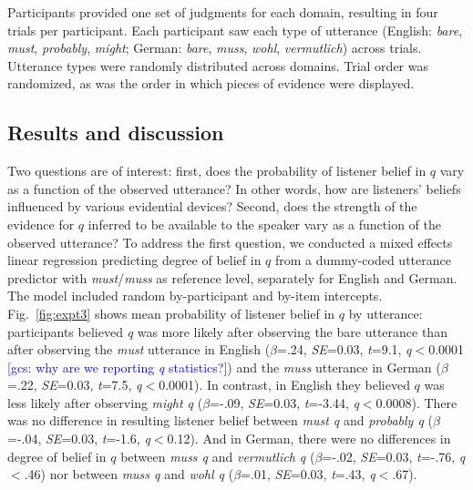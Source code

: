 \documentclass[11pt]{article}
\newcommand{\gcs}[1]{\textcolor{blue}{[gcs: #1]}}
\begin{document}
Participants provided one set of judgments for each domain, resulting in four trials per participant. Each participant saw each type of utterance (English: \emph{bare}, \emph{must}, \emph{probably}, \emph{might}; German: \emph{bare}, \emph{muss}, \emph{wohl}, \emph{vermutlich}) across trials. Utterance types were randomly distributed across domains. Trial order was randomized, as was the order in which pieces of evidence were displayed.


\subsection{Results and discussion}

Two questions are of interest: first, does the probability of listener belief in $q$ vary as a function of the observed utterance? In other words, how are listeners' beliefs influenced by various evidential devices? Second, does the strength of the evidence for $q$ inferred to be available to the speaker vary as a function of the observed utterance? To address the first question, we conducted a mixed effects linear regression predicting degree of belief in $q$ from a dummy-coded utterance predictor with \emph{must}/\emph{muss} as reference level, separately for English and German. The model included random by-participant and by-item intercepts. Fig.~\ref{fig:expt3} shows mean probability of listener belief in $q$ by utterance: participants believed \emph{q} was more likely after observing the bare utterance than after observing the \emph{must} utterance in English  ($\beta$=.24, \emph{SE}=0.03, \emph{t}=9.1, \emph{q}$<$0.0001 \gcs{why are we reporting \emph{q} statistics?}) and the \emph{muss} utterance in German ($\beta$=.22, \emph{SE}=0.03, \emph{t}=7.5, \emph{q}$<$0.0001). In contrast, in English they believed $q$ was less likely after observing \emph{might q} ($\beta$=-.09, \emph{SE}=0.03, \emph{t}=-3.44, \emph{q}$<$0.0008). There was no difference in resulting listener belief between \emph{must q} and \emph{probably q} ($\beta$=-.04, \emph{SE}=0.03, \emph{t}=-1.6, \emph{q}$<$0.12). And in German, there were no differences in degree of belief in $q$ between \emph{muss q} and \emph{vermutlich q} ($\beta$=-.02, \emph{SE}=0.03, \emph{t}=-.76, \emph{q}$<$.46) nor between \emph{muss q} and \emph{wohl q} ($\beta$=.01, \emph{SE}=0.03, \emph{t}=.43, \emph{q}$<$.67). %
\end{document}
